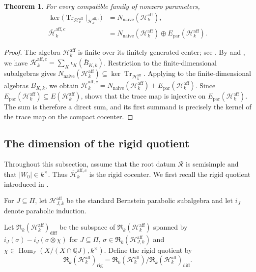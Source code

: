 \documentclass[11pt,letterpaper]{amsart}
\newtheorem{theorem}{Theorem}
\theoremstyle{definition}
\numberwithin{equation}{section}
\numberwithin{theorem}{section}
\newcommand{\kk}{k}
\newcommand{\ZZ}{\mathbb Z}
\newcommand{\QQ}{\mathbb Q}
\newcommand{\cH}{\mathcal H}
\newcommand{\bH}{\overline{\mathcal H}}
\newcommand{\cR}{\mathfrak R}
\newcommand{\rig}{\mathrm{rig}}
\newcommand{\naive}{\mathrm{naive}}
\DeclareMathOperator{\Tr}{Tr}
\DeclareMathOperator{\Hom}{Hom}
\begin{document}
\begin{theorem}\label{thm:affine-kernel}
For every compatible family of nonzero parameters,
\[
 \begin{aligned}
 \ker\bigl(
   \Tr_{\cH_\kk^{\mathrm{aff}}}
      |_{\bH_\kk^{\mathrm{aff},c}}
 \bigr)
   &=N_{\naive}(\cH_\kk^{\mathrm{aff}}),\\
 \bH_\kk^{\mathrm{aff},c}
   &=N_{\naive}(\cH_\kk^{\mathrm{aff}})
      \oplus E_{\mathrm{par}}(\cH_\kk^{\mathrm{aff}}).
 \end{aligned}
\]
\end{theorem}

\begin{proof}
The algebra $\cH_\kk^{\mathrm{aff}}$ is finite over its
finitely generated center; see
\cite[Theorem~2 and \S1.6]{Vig}. By \cite[Corollary~2.8]{HN14} and
\cite[\S3.7.1]{He16}, we have $\bH_\kk^{\mathrm{aff},c}
   =\sum_K\iota_K(\bar B_{K,\kk})$. Restriction to the finite-dimensional subalgebras gives $N_{\naive}(\cH_\kk^{\mathrm{aff}})
   \subseteq\ker\Tr_{\cH_\kk^{\mathrm{aff}}}$.
Applying  to the finite-dimensional algebras $B_{K,\kk}$, we obtain $\bH_\kk^{\mathrm{aff},c}=N_{\naive}(\cH_\kk^{\mathrm{aff}})+E_{\mathrm{par}}(\cH_\kk^{\mathrm{aff}})$.
Since
$E_{\mathrm{par}}(\cH_\kk^{\mathrm{aff}})
 \subseteq E(\cH_\kk^{\mathrm{aff}})$,
 shows that the trace map is injective on $E_{\mathrm{par}}(\cH_\kk^{\mathrm{aff}})$. The sum is therefore a direct sum, and its first summand is precisely the kernel of the trace map on the compact cocenter.
\end{proof}

\subsection{The dimension of the rigid quotient}
\label{subsec:affine-characters}

Throughout this subsection, assume that the root datum $\mathscr R$ is semisimple and that $|W_0|\in\kk^\times$. Thus $\bH_\kk^{\mathrm{aff},c}$ is the rigid cocenter. We first recall the rigid quotient introduced in \cite[Definition~6.1]{CH}.

For $J\subseteq\Pi$, let $\cH_{J,\kk}^{\mathrm{aff}}$
be the standard Bernstein parabolic subalgebra and let
$i_J$ denote parabolic induction.

Let
$\cR_\kk(\cH_\kk^{\mathrm{aff}})_{\mathrm{diff}}$
be the subspace of $\cR_\kk(\cH_\kk^{\mathrm{aff}})$ spanned by $i_J(\sigma)-i_J(\sigma\otimes\chi)$ for 
$J\subseteq\Pi$, $\sigma\in\cR_\kk(\cH_{J,\kk}^{\mathrm{aff}})$ and $\chi\in\Hom_{\ZZ}(X/(X\cap\QQ J),\kk^\times)$.
Define the rigid quotient by
\[
 \cR_\kk(\cH_\kk^{\mathrm{aff}})_{\rig}
 =
 \cR_\kk(\cH_\kk^{\mathrm{aff}})
 \big/
 \cR_\kk(\cH_\kk^{\mathrm{aff}})_{\mathrm{diff}}.
\]
\end{document}
